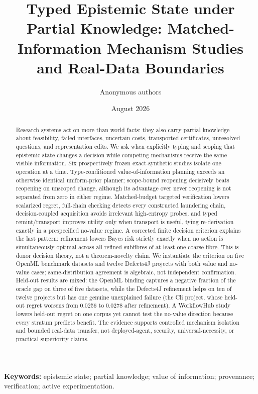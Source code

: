 \documentclass[11pt]{article}
\title{Typed Epistemic State under Partial Knowledge: Matched-Information Mechanism Studies and Real-Data Boundaries}
\author{Anonymous authors}
\date{August 2026}
\begin{document}
\maketitle
\begin{abstract}
Research systems act on more than world facts: they also carry partial knowledge about feasibility, failed interfaces, uncertain costs, transported certificates, unresolved questions, and representation edits. We ask when explicitly typing and scoping that epistemic state changes a decision while competing mechanisms receive the same visible information. Six prospectively frozen exact-synthetic studies isolate one operation at a time. Type-conditioned value-of-information planning exceeds an otherwise identical uniform-prior planner; scope-bound reopening decisively beats reopening on unscoped change, although its advantage over never reopening is not separated from zero in either regime. Matched-budget targeted verification lowers scalarized regret, full-chain checking detects every constructed laundering chain, decision-coupled acquisition avoids irrelevant high-entropy probes, and typed remint/transport improves utility only when transport is useful, tying re-derivation exactly in a prespecified no-value regime. A corrected finite decision criterion explains the last pattern: refinement lowers Bayes risk strictly exactly when no action is simultaneously optimal across all refined subfibres of at least one coarse fibre. This is donor decision theory, not a theorem-novelty claim. We instantiate the criterion on five OpenML benchmark datasets and twelve Defects4J projects with both value and no-value cases; same-distribution agreement is algebraic, not independent confirmation. Held-out results are mixed: the OpenML binding captures a negative fraction of the oracle gap on three of five datasets, while the Defects4J refinement helps on ten of twelve projects but has one genuine unexplained failure (the Cli project, whose held-out regret worsens from 0.0256 to 0.0278 after refinement). A WorkflowHub study lowers held-out regret on one corpus yet cannot test the no-value direction because every stratum predicts benefit. The evidence supports controlled mechanism isolation and bounded real-data transfer, not deployed-agent, security, universal-necessity, or practical-superiority claims.
\end{abstract}

\noindent\textbf{Keywords:} epistemic state; partial knowledge; value of information; provenance; verification; active experimentation.













\end{document}
